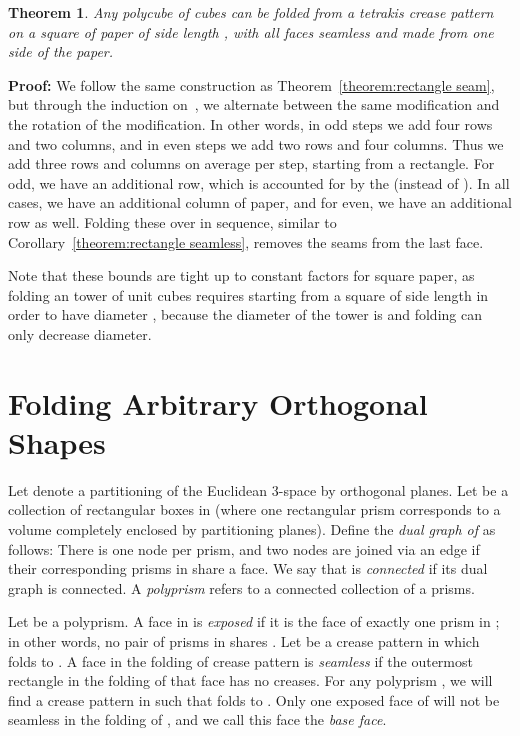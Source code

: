\documentclass[11pt]{article}
\newtheorem{theorem}{Theorem}
\newcommand{\theolab}[1]{\label{theorem:#1}}
\newcommand{\theoref}[1]{\ref{theorem:#1}}
\newenvironment{proof}{\noindent\textbf{Proof: }\ignorespaces}
  {\hspace*{\fill}\medskip}
\newif\iffull
\begin{document}
\begin{theorem} \theolab{cube}
  Any polycube of  cubes can be folded from a tetrakis crease pattern
  on a square of paper of side length ,
  with all faces seamless and made from one side of the paper.
\end{theorem}

\begin{proof}
  We follow the same construction as Theorem~\theoref{rectangle seam},
  but through the induction on~, we alternate between the same modification
  and the  rotation of the modification.  In other words,
  in odd steps we add four rows and two columns, and in even steps
  we add two rows and four columns.  Thus we add three rows and columns
  on average per step, starting from a  rectangle.
  For  odd, we have an additional row, which is accounted for by the 
  (instead of ).
  In all cases, we have an additional column of paper, and for  even,
  we have an additional row as well.  Folding these over in sequence,
  similar to Corollary~\theoref{rectangle seamless}, removes the seams
  from the last face.
\end{proof}



Note that these bounds are tight up to constant factors for square paper,
as folding an  tower of unit cubes requires starting from
a square of side length  in order to have diameter ,
because the diameter of the tower is  and folding can only decrease
diameter.






\iffull

\section{Folding Arbitrary Orthogonal Shapes}

Let  denote a partitioning of the Euclidean 3-space by orthogonal planes. Let  be a collection of rectangular boxes in  (where one rectangular prism corresponds to a volume completely enclosed by partitioning planes). 
Define the \emph{dual graph of } as follows:  
There is one node per prism, and two nodes are joined via an edge if their corresponding prisms in  share a face. We say that  is \emph{connected} if its dual graph is connected. A \emph{polyprism} refers to a connected collection of a prisms.  

Let  be a polyprism.  A face  in  is \emph{exposed} if it is the face of exactly one prism in ; in other words, no pair of prisms in  shares .  Let  be a crease pattern in  which folds to .  A face in the folding of crease pattern  is \emph{seamless} if the outermost rectangle in the folding of that face has no creases. For any polyprism , we will find a crease pattern  in  such that  folds to . Only one exposed face of  will not be seamless in the folding of , and we call this face the \emph{base face}. 
\end{document}
